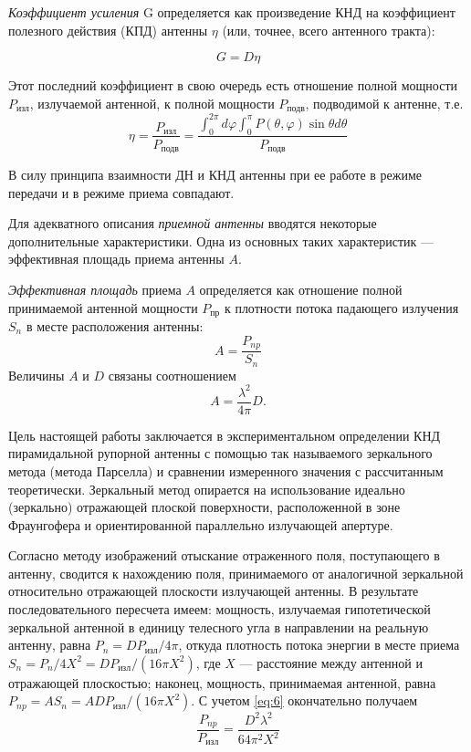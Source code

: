 \textit{Коэффициент усиления} G определяется как произведение КНД на коэффициент полезного действия (КПД) антенны $\eta$
(или, точнее, всего антенного тракта):

\begin{equation}
    G = D\eta
    \label{eq:3}    
\end{equation}

Этот последний коэффициент в свою очередь есть отношение полной мощности $P_{\text{изл}}$, излучаемой антенной, к полной
мощности $P_{\text{подв}}$, подводимой к антенне, т.е.
\begin{equation}
    \eta =\frac{P_{\text{изл}}}{P_{\text{подв}}} = \frac{\int_{0}^{2 \pi} d \varphi \int_{0}^{\pi} P(\theta, \varphi) \sin \theta d \theta}{P_{\text{подв}}}
    \label{eq:4}    
\end{equation}

В силу принципа взаимности ДН и КНД антенны при ее работе в режиме передачи и в режиме приема совпадают.

Для адекватного описания \textit{приемной антенны} вводятся некоторые дополнительные характеристики. 
Одна из основных таких характеристик — эффективная площадь приема антенны $A$.

\textit{Эффективная площадь} приема $A$ определяется как отношение полной принимаемой антенной мощности 
$P_{\text{пр}}$ к плотности потока падающего
излучения $S_n$ в месте расположения антенны:
\begin{equation}
    A = \frac{P_{np}}{S_n}
    \label{eq:5}
\end{equation}
Величины $A$ и $D$ связаны соотношением
\begin{equation}
    A = \frac{\lambda^2}{4\pi}D.
    \label{eq:6}
\end{equation}

Цель настоящей работы заключается в экспериментальном определении КНД пирамидальной рупорной антенны с помощью так 
называемого зеркального метода (метода Парселла) и сравнении измеренного значения с рассчитанным теоретически. 
Зеркальный метод опирается на использование идеально (зеркально) отражающей плоской поверхности, расположенной в зоне 
Фраунгофера и ориентированной параллельно излучающей апертуре.

Согласно методу изображений отыскание отраженного поля, поступающего в антенну, сводится к нахождению поля, 
принимаемого от аналогичной зеркальной относительно отражающей плоскости излучающей антенны. В результате 
последовательного пересчета имеем: мощность, излучаемая гипотетической зеркальной антенной в единицу телесного угла 
в направлении на реальную антенну, равна $P_n = D P_{\text{изл}}/4\pi$, откуда плотность потока энергии в месте приема 
$S_n = P_n/4X^2 = D P_{\text{изл}}/(16\pi X^2)$, где $X$ — расстояние между антенной и отражающей плоскостью; наконец, 
мощность, принимаемая антенной, равна $P_{np} =A S_n =A D P_{\text{изл}}/(16\pi X^2)$. С учетом \ref{eq:6} окончательно 
получаем
\begin{equation}
    \frac{P_{np}}{P_{\text{изл}}} = \frac{D^2\lambda^2}{64\pi^2X^2}
    \label{eq:7}
\end{equation}

